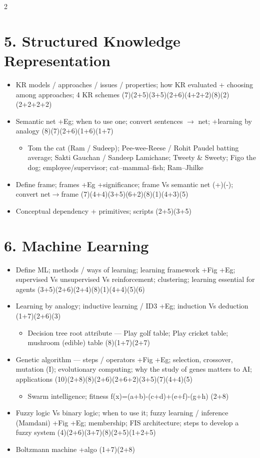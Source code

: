 \documentclass[10pt]{article}
\begin{document}
\begin{multicols}{2}
\section*{5. Structured Knowledge Representation}
\begin{itemize}
  \item KR models / approaches / issues / properties; how KR evaluated + choosing among approaches; 4 KR schemes \hfill (7)(2+5)(3+5)(2+6)(4+2+2)(8)(2)(2+2+2+2)
  \item Semantic net +Eg; when to use one; convert sentences $\to$ net; +learning by analogy \hfill (8)(7)(2+6)(1+6)(1+7)
    \begin{itemize}
      \item Tom the cat (Ram / Sudeep); Pee-wee-Reese / Rohit Paudel batting average; Sakti Gauchan / Sandeep Lamichane; Tweety \& Sweety; Figo the dog; employee/supervisor; cat--mammal--fish; Ram--Jhilke
    \end{itemize}
  \item Define frame; frames +Eg +significance; frame Vs semantic net (+)(-); convert net$\to$frame \hfill (7)(4+4)(3+5)(6+2)(8)(1)(4+3)(5)
  \item Conceptual dependency + primitives; scripts \hfill (2+5)(3+5)
\end{itemize}

\section*{6. Machine Learning}
\begin{itemize}
  \item Define ML; methods / ways of learning; learning framework +Fig +Eg; supervised Vs unsupervised Vs reinforcement; clustering; learning essential for agents \hfill (3+5)(2+6)(2+4)(8)(1)(4+4)(5)(6)
  \item Learning by analogy; inductive learning / ID3 +Eg; induction Vs deduction \hfill (1+7)(2+6)(3)
    \begin{itemize}
      \item Decision tree root attribute --- Play golf table; Play cricket table; mushroom (edible) table \hfill (8)(1+7)(2+7)
    \end{itemize}
  \item Genetic algorithm --- steps / operators +Fig +Eg; selection, crossover, mutation (I); evolutionary computing; why the study of genes matters to AI; applications \hfill (10)(2+8)(8)(2+6)(2+6+2)(3+5)(7)(4+4)(5)
    \begin{itemize}
      \item Swarm intelligence; fitness f(x)=(a+b)-(c+d)+(e+f)-(g+h) \hfill (2+8)
    \end{itemize}
  \item Fuzzy logic Vs binary logic; when to use it; fuzzy learning / inference (Mamdani) +Fig +Eg; membership; FIS architecture; steps to develop a fuzzy system \hfill (4)(2+6)(3+7)(8)(2+5)(1+2+5)
  \item Boltzmann machine +algo \hfill (1+7)(2+8)
\end{itemize}


\end{multicols}
\end{document}
